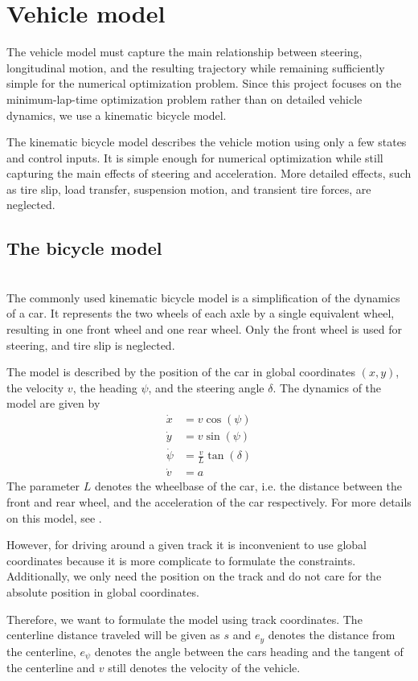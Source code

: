 \section{Vehicle model}
The vehicle model must capture the main relationship between steering, longitudinal motion, and the resulting trajectory while remaining sufficiently simple for the numerical optimization problem. Since this project focuses on the minimum-lap-time optimization problem rather than on detailed vehicle dynamics, we use a kinematic bicycle model.

The kinematic bicycle model describes the vehicle motion using only a few states and control inputs. It is simple enough for numerical optimization while still capturing the main effects of steering and acceleration. More detailed effects, such as tire slip, load transfer, suspension motion, and transient tire forces, are neglected.
\subsection{The bicycle model}\;\\
The commonly used kinematic bicycle model is a simplification of the dynamics of a car. It represents the two wheels of each axle by a single equivalent wheel, resulting in one front wheel and one rear wheel. Only the front wheel is used for steering, and tire slip is neglected.

The model is described by the position of the car in global coordinates $(x,y)$, the velocity $v$, the heading $\psi$, and the steering angle $\delta$. The dynamics of the model are given by
\begin{align*}
    \dot{x} &= v \cos(\psi) \\
    \dot{y} &= v \sin(\psi) \\
    \dot{\psi} &= \frac{v}{L} \tan(\delta) \\
    \dot{v} &= a
\end{align*}
The parameter $L$ denotes the wheelbase of the car, i.e. the distance between the front and rear wheel, and the acceleration of the car respectively. For more details on this model, see \cite{Rajamani2012}.

However, for driving around a given track it is inconvenient to use global coordinates because it is more complicate to formulate the constraints. Additionally, we only need the position on the track and do not care for the absolute position in global coordinates.

Therefore, we want to formulate the model using track coordinates. The centerline distance traveled will be given as $s$ and $e_y$ denotes the distance from the centerline, $e_\psi$ denotes the angle between the cars heading and the tangent of the centerline and $v$ still denotes the velocity of the vehicle.


